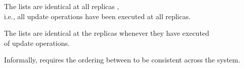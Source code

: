 
\begin{frame}{}
  \centerline{\Huge {}}
\end{frame}

\begin{frame}{}
  \begin{definition}
    The lists are identical at all replicas , \\
    i.e., all update operations have been executed at all replicas.
  \end{definition}

  \pause
  \vspace{0.50cm}
  \begin{definition}
    The lists are identical at the replicas whenever they have executed \\  of update operations.
  \end{definition}

  \pause
  \vspace{0.60cm}
  \centerline{}
\end{frame}

\begin{frame}{}

  \vspace{0.20cm}
  \begin{definition}
    Informally, \wlspec{} requires the ordering between  to be consistent across the system.
  \end{definition}

  \vspace{0.60cm}
  \centerline{}
\end{frame}

